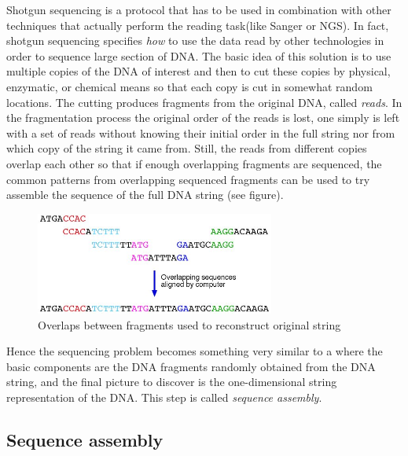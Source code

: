 \documentclass[a4paper,12pt, oneside]{article}
\begin{document}
Shotgun sequencing is a protocol that has to be used in combination with other techniques that actually perform the reading task(like Sanger or NGS).
In fact, shotgun sequencing specifies \textit{how} to use the data read by other technologies in order to sequence large section of DNA.
The basic idea of this solution is to use multiple copies of the DNA of interest and then to cut these copies by physical, enzymatic, or chemical means so that each copy is cut in somewhat random locations. The cutting produces fragments from the original DNA, called \textit{reads}. In the fragmentation process the original order of the reads is lost, one simply is left with a set of reads without knowing their initial order in the full string nor from which copy of the string it came from. Still, the reads from different copies overlap each other so that if enough overlapping fragments are sequenced, the common patterns from overlapping sequenced fragments can be used to try assemble the sequence of the full DNA string (see figure).
\begin{figure}
	\includegraphics[width=0.7\textwidth]{seqoverlaps.jpeg}
	\centering
	\caption{Overlaps between fragments used to reconstruct original string}
	\label{fig:seqoverlaps}
\end{figure}
Hence the sequencing problem becomes something very similar to a  where the basic components are the DNA fragments randomly obtained from the DNA string, and the final picture to discover is the one-dimensional string representation of the DNA. This step is called \textit{sequence assembly}.

\subsection{Sequence assembly}
\end{document}
